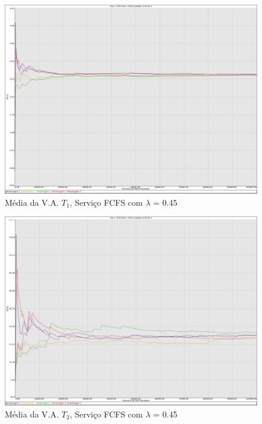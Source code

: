 \documentclass[a4paper,10pt]{article}
\begin{document}
\begin{figure}
	\caption{Média da V.A. $T_1$, Serviço FCFS com $\lambda$ = 0.45}
	\label{figTransienteFCFSfila1T}
	\includegraphics[scale = 0.20]{./graficos_transiente_1/FCFS/05.png}
\end{figure}

\begin{figure}
	\caption{Média da V.A. $T_2$, Serviço FCFS com $\lambda$ = 0.45}
	\label{figTransienteFCFSfila2T}
	\includegraphics[scale = 0.20]{./graficos_transiente_1/FCFS/06.png}
\end{figure}
\end{document}
